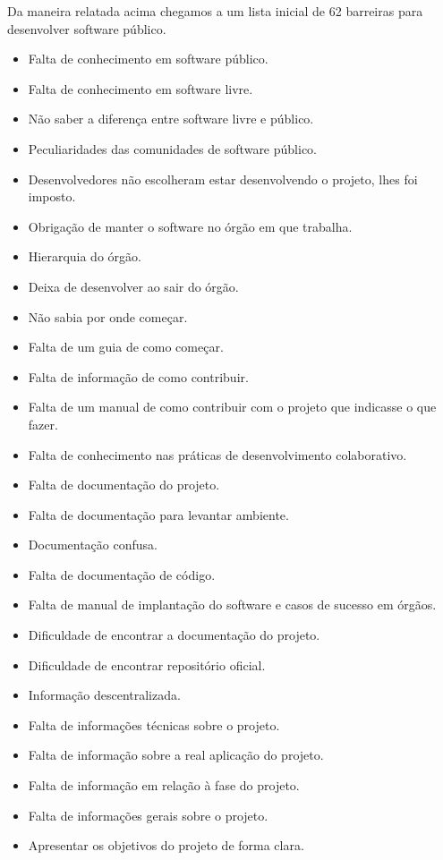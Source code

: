 Da maneira relatada acima chegamos a um lista inicial de 62 barreiras para desenvolver
software público. 

\begin{itemize}
\item Falta de conhecimento em software público.
\item Falta de conhecimento em software livre.
\item Não saber a diferença entre software livre e público.
\item Peculiaridades das comunidades de software público.
%
\item Desenvolvedores não escolheram estar desenvolvendo o projeto, lhes foi imposto.
\item Obrigação de manter o software no órgão em que trabalha.
\item Hierarquia do órgão.
\item Deixa de desenvolver ao sair do órgão.
%
\item Não sabia por onde começar.
\item Falta de um guia de como começar.
\item Falta de informação de como contribuir.
\item Falta de um manual de como contribuir com o projeto que indicasse o que fazer.
\item Falta de conhecimento nas práticas de desenvolvimento colaborativo.
%
\item Falta de documentação do projeto.
\item Falta de documentação para levantar ambiente.
\item Documentação confusa.
\item Falta de documentação de código.
\item Falta de manual de implantação do software e casos de sucesso em órgãos.
\item Dificuldade de encontrar a documentação do projeto.
%
\item Dificuldade de encontrar repositório oficial.
\item Informação descentralizada.
\item Falta de informações técnicas sobre o projeto.
\item Falta de informação sobre a real aplicação do projeto.
\item Falta de informação em relação à fase do projeto.
\item Falta de informações gerais sobre o projeto.
\item Apresentar os objetivos do projeto de forma clara.

\end{itemize}
